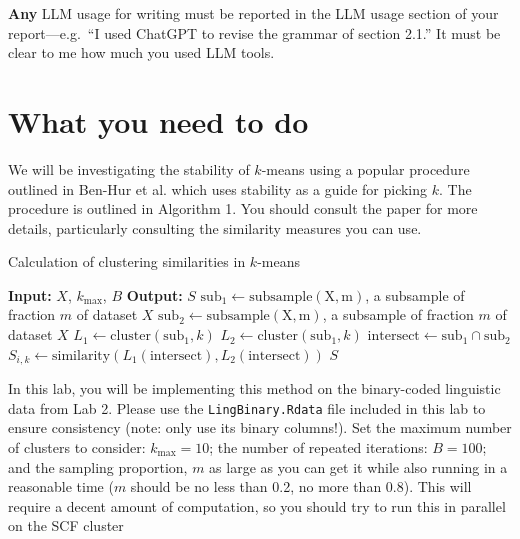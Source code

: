 \documentclass[letterpaper,12pt]{article}
\begin{document}
\textbf{Any} LLM usage for writing must be reported in the LLM usage section of your report---e.g.~``I used ChatGPT to revise the grammar of section 2.1.'' It must be clear to me how much you used LLM tools.

\section{What you need to do}

We will be investigating the stability of $k$-means using a popular procedure outlined in Ben-Hur et al. which uses stability as a guide for picking $k$. The procedure is outlined in Algorithm 1. You should consult the paper for more details, particularly consulting the similarity measures you can use.

\begin{algorithm}[h]
    \caption{Calculation of clustering similarities in $k$-means}
    \begin{algorithmic}
        \State \textbf{Input:} $X$, $k_\mathrm{max}$, $B$
        \State \textbf{Output:} $S$
                \State $\mathrm{sub}_1 \leftarrow \mathrm{subsample(X,m)}$, a subsample of fraction $m$ of dataset $X$
                \State $\mathrm{sub}_2 \leftarrow \mathrm{subsample(X,m)}$, a subsample of fraction $m$ of dataset $X$
                \State $L_1\leftarrow\mathrm{cluster}(\mathrm{sub}_1,k)$
                \State $L_2\leftarrow\mathrm{cluster}(\mathrm{sub}_1,k)$
                \State $\mathrm{intersect}\leftarrow\mathrm{sub}_1\cap\mathrm{sub}_2$
                \State $S_{i,k}\leftarrow\mathrm{similarity}(L_1(\mathrm{intersect}),L_2(\mathrm{intersect}))$
            \EndFor
        \EndFor
        \State \Return $S$
    \end{algorithmic}
\end{algorithm}

In this lab, you will be implementing this method on the binary-coded linguistic data from Lab 2. Please use the \texttt{LingBinary.Rdata} file included in this lab to ensure consistency (note: only use its binary columns!). Set the maximum number of clusters to consider: $k_{\mathrm{max}}=10$; the number of repeated iterations: $B=100$; and the sampling proportion, $m$ as large as you can get it while also running in a reasonable time ($m$ should be no less than 0.2, no more than 0.8). This will require a decent amount of computation, so you should try to run this in parallel on the SCF cluster
\end{document}
